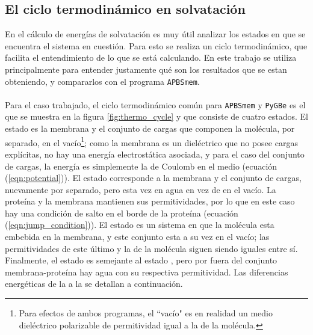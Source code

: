 \documentclass[12pt, twoside, onehalfspace, numbers, spanish]{ezthesis}
\numberwithin{equation}{section}
\newcommand{\circled}[1]{\tikz[baseline=(char.base)]{\node[shape=circle,draw,inner sep=1pt] (char) {#1};}}
\begin{document}
%





\subsection{El ciclo termodinámico en solvatación}
En el cálculo de energías de solvatación es muy útil analizar los estados en que se encuentra el sistema en cuestión. Para esto se realiza un ciclo termodinámico, que facilita el entendimiento de lo que se está calculando. En este trabajo se utiliza principalmente para entender justamente qué son los resultados que se estan obteniendo, y compararlos con el programa \texttt{APBSmem}.\\\\
Para el caso trabajado, el ciclo termodinámico común para \texttt{APBSmem} y \texttt{PyGBe} es el que se muestra en la figura \ref{fig:thermo_cycle} y que consiste de cuatro estados. El estado \circled{1} es la membrana y el conjunto de cargas que componen la molécula, por separado, en el vacío\footnote{Para efectos de ambos programas, el ``vacío" es en realidad un medio dieléctrico polarizable de permitividad igual a la de la molécula.}; como la membrana es un dieléctrico que no posee cargas explícitas, no hay una energía electrostática asociada, y para el caso del conjunto de cargas, la energía es simplemente la de Coulomb en el medio (ecuación (\ref{eqn:potential})). El estado \circled{2} corresponde a la membrana y el conjunto de cargas, nuevamente por separado, pero esta vez en agua en vez de en el vacío. La proteína y la membrana mantienen sus permitividades, por lo que en este caso hay una condición de salto en el borde de la proteína (ecuación (\ref{eqn:jump_condition})). El estado \circled{3} es un sistema en que la molécula esta embebida en la membrana, y este conjunto esta a su vez en el vacío; las permitividades de este último y la de la molécula siguen siendo iguales entre sí. Finalmente, el estado \circled{4} es semejante al estado \circled{3}, pero por fuera del conjunto membrana-proteína hay agua con su respectiva permitividad. Las diferencias energéticas de la \circled{A} a la \circled{E} se detallan a continuación.
\end{document}
